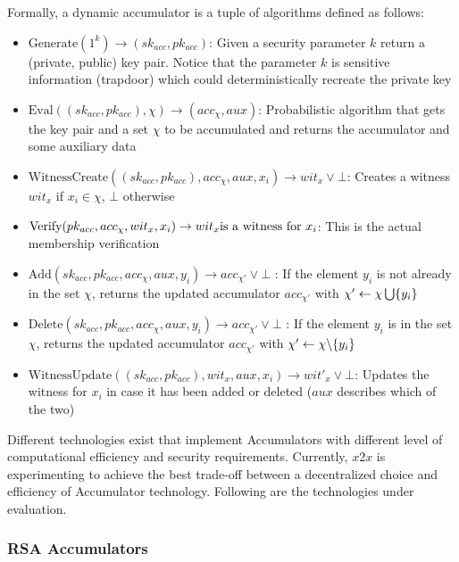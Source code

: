 Formally, a dynamic accumulator is a tuple of algorithms defined as follows:

\begin{itemize}
\item  $\textrm{Generate}(1^k)\rightarrow (sk_{acc}, pk_{acc})$: Given a security parameter $k$ return a (private, public) key pair. Notice that the parameter $k$ is sensitive information (trapdoor) which could deterministically recreate the private key  
\item  $\textrm{Eval}((sk_{acc}, pk_{acc}), \chi) \rightarrow (acc_\chi, aux)$: Probabilistic algorithm that gets the key pair and a set $\chi$ to be accumulated and returns the accumulator and some auxiliary data
\item  $\textrm{WitnessCreate}((sk_{acc}, pk_{acc}), acc_\chi, aux, x_i)\rightarrow wit_x \lor \bot$: Creates a witness $wit_x$ if $x_i \in \chi$, $\bot$ otherwise
\item  $\textrm{Verify}(pk_{acc}, acc_\chi, wit_x, x_i)\rightarrow wit_x\space \textrm{is a witness for }x_i$: This is the actual membership verification
\item  $\textrm{Add}(sk_{acc}, pk_{acc}, acc_\chi, aux, y_i)\rightarrow acc_{\chi'} \lor \bot$ : If the element $y_i$ is not already in the set $\chi$, returns the updated accumulator $acc_{\chi'}$ with $\chi' \leftarrow \chi \space \bigcup \space \{y_i\}$ 
\item  $\textrm{Delete}(sk_{acc}, pk_{acc}, acc_\chi, aux, y_i)\rightarrow acc_{\chi'} \lor \bot$ : If the element $y_i$ is in the set $\chi$, returns the updated accumulator $acc_{\chi'}$ with $\chi' \leftarrow \chi \space \backslash \space \{y_i\}$
\item  $\textrm{WitnessUpdate}((sk_{acc}, pk_{acc}), wit_x, aux, x_i)\rightarrow wit'_x \lor \bot$: Updates the witness for $x_i$ in case it has been added or deleted ($aux$ describes which of the two)
\end{itemize}

Different technologies exist that implement Accumulators with different level of computational efficiency and security requirements. Currently, $x2x$ is experimenting to achieve the best trade-off between a decentralized choice and efficiency of Accumulator technology. Following are the technologies under evaluation.

\subsubsection{RSA Accumulators}

